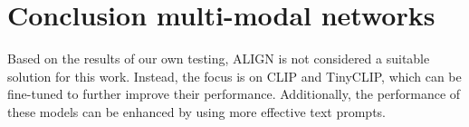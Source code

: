 \section{Conclusion multi-modal networks}
    Based on the results of our own testing, ALIGN is not considered a suitable solution for this work. 
    Instead, the focus is on CLIP and TinyCLIP, which can be fine-tuned to further improve their performance. 
    Additionally, the performance of these models can be enhanced by using more effective text prompts.
